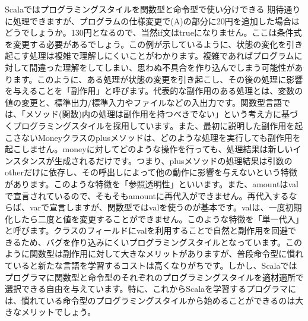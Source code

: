 \begin{itembox}[l]{Scalaではプログラミングスタイルを関数型と命令型で使い分けできる}
期待通りに処理できますが、プログラムの仕様変更で(A)の部分に20円を追加した場合はどうでしょうか。130円となるので、当然if文はtrueになりません。ここは条件式を変更する必要があるでしょう。この例が示しているように、状態の変化を引き起こす処理は複雑で理解しにくいことがわかります。複雑であればプログラムに対して間違った理解をしてしまい、思わぬ不具合を作り込んでしまう可能性があります。このように、ある処理が状態の変更を引き起こし、その後の処理に影響を与えることを「副作用」と呼びます。代表的な副作用のある処理とは、変数の値の変更と、標準出力/標準入力やファイルなどの入出力です。関数型言語では、「メソッド(関数)内の処理は副作用を持つべきでない」という考え方に基づくプログラミングスタイルを採用しています。また、最初に説明した副作用を起こさないMoneyクラスのplusメソッドは、どのような処理を実行しても副作用を起こしません。moneyに対してどのような操作を行っても、処理結果は新しいインスタンスが生成されるだけです。つまり、plusメソッドの処理結果は引数のotherだけに依存し、その呼出しによって他の動作に影響を与えないという特徴があります。このような特徴を「参照透明性」といいます。また、amountはvalで宣言されているので、そもそもamountに再代入ができません。再代入するならば、varで宣言しますが、関数型ではvalを使うのが基本です。valは、一度初期化したら二度と値を変更することができません。このような特徴を「単一代入」と呼びます。クラスのフィールドにvalを利用することで自然と副作用を回避できるため、バグを作り込みにくいプログラミングスタイルとなっています。このように関数型は副作用に対して大きなメリットがありますが、普段命令型に慣れていると新たな言語を学習するコストは高くなりがちです。しかし、Scalaではプログラマに関数型と命令型のそれぞれのプログラミングスタイルを適材適所で選択できる自由を与えています。特に、これからScalaを学習するプログラマには、慣れている命令型のプログラミングスタイルから始めることができるのは大きなメリットでしょう。
\end{itembox}

